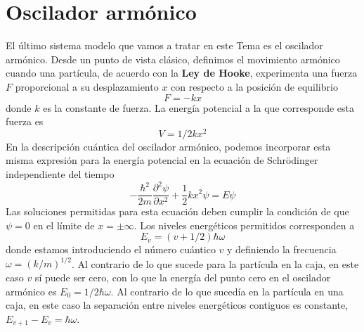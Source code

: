 \documentclass{tufte-handout}
\begin{document}
\section{Oscilador armónico}
El último sistema modelo que vamos a tratar en este Tema es
el oscilador armónico. Desde un punto de vista clásico, 
definimos el movimiento armónico cuando una partícula,
de acuerdo con la \textbf{Ley de Hooke}, experimenta una fuerza $F$ proporcional a su desplazamiento $x$ con 
respecto a la posición de equilibrio
\begin{equation}
    F=-kx
\end{equation}
donde $k$ es la constante de fuerza. La energía potencial 
a la que corresponde esta fuerza es
\begin{equation}
    V= 1/2kx^2
\end{equation}
En la descripción cuántica del oscilador armónico, podemos 
incorporar esta misma expresión para la energía potencial
en la ecuación de Schrödinger independiente del tiempo
\begin{equation}
    -\frac{\hbar^2}{2m}\frac{\partial^2\psi}{\partial x^2}
    + \frac{1}{2}kx^2\psi=E\psi \label{eq:schrodinger_ho}
\end{equation}
Las soluciones permitidas para esta ecuación deben cumplir
la condición de que $\psi=0$ en el límite de $x=\pm\infty$.
Los niveles energéticos permitidos corresponden a 
\begin{equation}
    E_v=(v+1/2)\hbar\omega
\end{equation}
donde estamos introduciendo el número cuántico $v$ y 
definiendo la frecuencia $\omega=(k/m)^{1/2}$. Al contrario
de lo que sucede para la partícula en la caja, en este 
caso $v$ sí puede ser cero, con lo que la energía del punto
cero en el oscilador armónico es $E_0=1/2\hbar\omega$. Al
contrario de lo que sucedía en la partícula en una caja, 
en este caso la separación entre niveles energéticos 
contiguos es constante, $E_{v+1}-E_{v}=\hbar\omega$.
\end{document}
